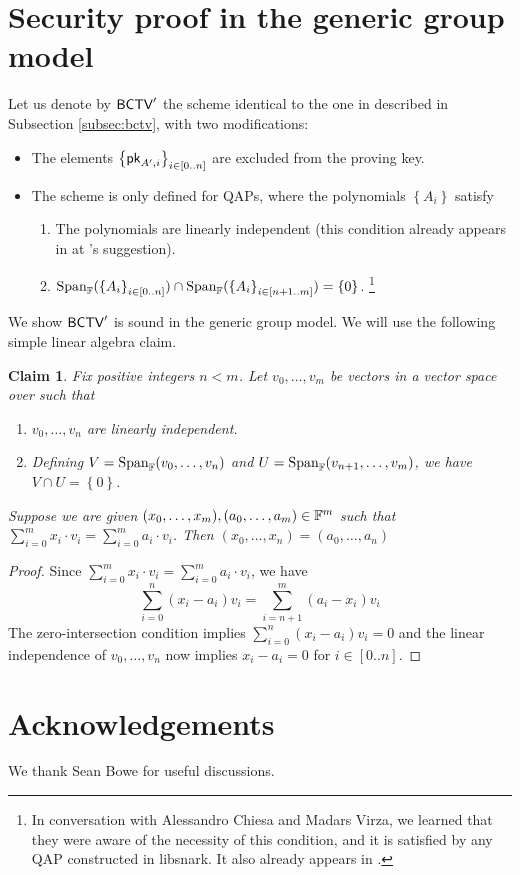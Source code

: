 \documentclass[11pt]{article}
\numberwithin{equation}{section} %
\numberwithin{figure}{section} %
\newtheorem{claim}[thm]{Claim}
\newcommand{\set}[1]{\ensuremath{\left\{#1\right\}}\xspace}
\begin{document}
 \renewcommand{\span}[1]{\ensuremath{\mathrm{Span}_{\F}(#1)}\xspace}
 \newcommand{\bctvprime}{\ensuremath{\bctv'}\xspace}
\section{Security proof in the generic group model}\label{sec:ggmproof}
Let us denote by \bctvprime the scheme identical to the one in \cite{BCTV} described in Subsection \ref{subsec:bctv},
with two modifications:
\begin{itemize}
 \item The elements $\sett{\pk_{A',i}}{i\in [0..n]}$ are excluded from the proving key.
 \item The scheme is only defined for QAPs, where the polynomials \set{A_i} satisfy
   \begin{enumerate}
    \item The polynomials  are linearly independent (this condition already appears in \cite{BCTV} at \cite{Parno15}'s suggestion).
    \item $\span{\sett{A_i}{i\in[0..n]}}\cap \span{\sett{A_i}{i\in [n+1..m]}}=\set{0}$. \footnote{In conversation with Alessandro Chiesa and Madars Virza, we  learned that they were aware of the necessity of this condition, and it is satisfied by any QAP constructed in libsnark\cite{libsnark}. It also already appears in \cite{BGG}.}
   \end{enumerate}

\end{itemize}

We show \bctvprime is sound in the generic group model.
We will use the following simple linear algebra claim.
\begin{claim}\label{clm:independence}
 Fix positive integers $n<m$. Let $v_0,\ldots,v_m$ be vectors in a vector space over \F such that
 \begin{enumerate}
  \item $v_0,\ldots,v_n$ are linearly independent.
  \item Defining $V = \span{v_0,\ldots,v_n}$ and $U=\span{v_{n+1},\ldots,v_m}$, we have $V\cap U =\set{0}$.
 \end{enumerate}
Suppose we are given $(x_0,\ldots,x_m),(a_0,\ldots,a_m)\in \mathbb F^m$ such that $\sum_{i=0}^m x_i\cdot v_i = \sum_{i=0}^m a_i\cdot v_i$.
Then $(x_0,\ldots,x_n) = (a_0,\ldots,a_n)$
\end{claim}
\begin{proof}
 Since $\sum_{i=0}^m x_i\cdot v_i = \sum_{i=0}^m a_i\cdot v_i$,
 we have
 \[\sum_{i=0}^n (x_i-a_i) v_i = \sum_{i=n+1}^m (a_i-x_i)v_i\]
 The zero-intersection condition implies $\sum_{i=0}^n (x_i-a_i) v_i=0 $
 and the linear independence of $v_0,\ldots,v_n$ now implies
 $x_i-a_i=0$ for $i\in [0..n]$.
 
\end{proof}


\section*{Acknowledgements}
We thank Sean Bowe for useful discussions.


\end{document}
